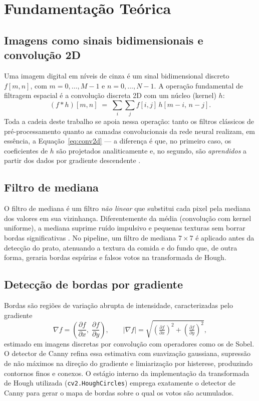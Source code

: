 \documentclass[12pt,a4paper]{article}
\begin{document}
\section{Fundamentação Teórica}

\subsection{Imagens como sinais bidimensionais e convolução 2D}

Uma imagem digital em níveis de cinza é um sinal bidimensional discreto $f[m,n]$, com
$m = 0,\dots,M-1$ e $n = 0,\dots,N-1$. A operação fundamental de filtragem espacial é a
convolução discreta 2D com um núcleo (kernel) $h$:
\begin{equation}
  (f * h)[m,n] \;=\; \sum_{i}\sum_{j} f[i,j]\, h[m-i,\, n-j].
  \label{eq:conv2d}
\end{equation}
Toda a cadeia deste trabalho se apoia nessa operação: tanto os filtros clássicos de
pré-processamento quanto as camadas convolucionais da rede neural realizam, em essência, a
Equação~\eqref{eq:conv2d} --- a diferença é que, no primeiro caso, os coeficientes de $h$ são
projetados analiticamente e, no segundo, são \emph{aprendidos} a partir dos dados por
gradiente descendente \cite{gonzalez}.

\subsection{Filtro de mediana}

O filtro de mediana é um filtro \emph{não linear} que substitui cada pixel pela mediana dos
valores em sua vizinhança. Diferentemente da média (convolução com kernel uniforme), a mediana
suprime ruído impulsivo e pequenas texturas sem borrar bordas significativas
\cite{gonzalez}. No pipeline, um filtro de mediana $7\times 7$ é aplicado antes da detecção do
prato, atenuando a textura da comida e do fundo que, de outra forma, geraria bordas espúrias e
falsos votos na transformada de Hough.

\subsection{Detecção de bordas por gradiente}

Bordas são regiões de variação abrupta de intensidade, caracterizadas pelo gradiente
\begin{equation}
  \nabla f = \left( \frac{\partial f}{\partial x},\; \frac{\partial f}{\partial y} \right),
  \qquad
  |\nabla f| = \sqrt{ \left(\tfrac{\partial f}{\partial x}\right)^2 +
                      \left(\tfrac{\partial f}{\partial y}\right)^2 },
\end{equation}
estimado em imagens discretas por convolução com operadores como os de Sobel. O detector de
Canny \cite{canny} refina essa estimativa com suavização gaussiana, supressão de não máximos
na direção do gradiente e limiarização por histerese, produzindo contornos finos e conexos.
O estágio interno da implementação da transformada de Hough utilizada
(\texttt{cv2.HoughCircles}) emprega exatamente o detector de Canny para gerar o mapa de bordas
sobre o qual os votos são acumulados.
\end{document}
